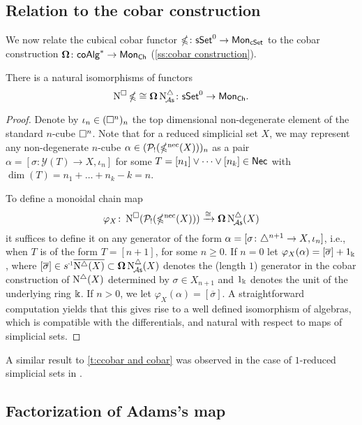 \subsection{Relation to the cobar construction}

We now relate the cubical cobar functor $\operatorname{\mathbb{\Omega}} \colon \mathsf{sSet}^0 \to \mathsf{Mon}_{\mathsf{cSet}}$ to the cobar construction $\operatorname{\mathbf{\Omega}} \colon \mathsf{coAlg}^\ast \to \mathsf{Mon}_{\mathsf{Ch}}$ (\cref{ss:cobar construction}).

\begin{theorem}\label{t:ccobar and cobar}
	There is a natural isomorphisms of functors
	\[
	\operatorname{N^{\square}} \operatorname{\mathbb{\Omega}} \cong \operatorname{\mathbf{\Omega}} \operatorname{N^{\triangle}_{\!{\mathcal{A}\mathsf{s}}}} \colon \mathsf{sSet}^0 \to \mathsf{Mon}_{\mathsf{Ch}}.
	\]
\end{theorem}

\begin{proof}
	Denote by $\iota_n \in (\square^n)_n$ the top dimensional non-degenerate element of the standard $n$-cube $\square^n$.
	Note that for a reduced simplicial set $X$, we may represent any non-degenerate $n$-cube $\alpha \in (\mathcal{P}_!(\operatorname{\mathbb{\Omega}^{\mathrm{nec}}}(X)))_n$ as a pair $\alpha = [\sigma \colon \mathcal{Y}(T) \to X, \iota_n]$ for some $T = [n_1] \vee \dots \vee [n_k] \in \mathsf{Nec}$ with $\dim(T) = n_1 + \dots + n_k - k = n$.

	To define a monoidal chain map
	\[
	\varphi_X \colon \operatorname{N^{\square}}(\mathcal{P}_!(\operatorname{\mathbb{\Omega}^{\mathrm{nec}}}(X))) \xrightarrow{\cong} \operatorname{\mathbf{\Omega}} \operatorname{N^{\triangle}_{\!{\mathcal{A}\mathsf{s}}}}(X)
	\]
	it suffices to define it on any generator of the form $\alpha=[\sigma \colon \triangle^{n+1} \to X, \iota_{n}]$, i.e., when $T$ is of the form $T = [n+1]$, for some $n \geq 0$.
	If $n = 0$ let $\varphi_X(\alpha)= [\overline{\sigma}] + 1_\Bbbk$, where $[\overline{\sigma}] \in \s{-1} \overline{ \schains(X)} \subset \cobar \schainsA(X)$ denotes the (length $1$) generator in the cobar construction of $\operatorname{N^{\triangle}}(X)$ determined by $\sigma \in X_{n+1}$ and $1_\Bbbk$ denotes the unit of the underlying ring $\Bbbk$.
	If $n > 0$, we let $\varphi_X(\alpha)=[\overline{\sigma}]$.
	A straightforward computation yields that this gives rise to a well defined isomorphism of algebras, which is compatible with the differentials, and natural with respect to maps of simplicial sets.
\end{proof}

A similar result to \cref{t:ccobar and cobar} was observed in the case of $1$-reduced simplicial sets in \cite[Section~3.5]{berger1995loops}.

\subsection{Factorization of Adams's map}\label{ss:factorization of adams}

